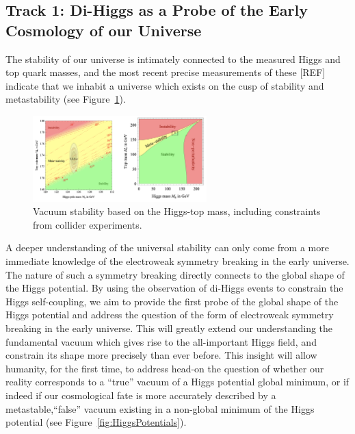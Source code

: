 \documentclass[10pt,oneside,notitlepage,abstracton,a4paper]{scrartcl}
\begin{document}
\subsection{Track 1: Di-Higgs as a Probe of the Early Cosmology of our Universe}

The stability of our universe is intimately connected to the measured Higgs and top quark masses, and the most recent precise measurements of these [REF] indicate that we inhabit a universe which exists on the cusp of stability and metastability (see Figure~\ref{fig:stabilityPlot}). \\

\begin{figure}[!ht]
\centering
\includegraphics[width=0.6\textwidth]{Figures/stability.png}
\caption{Vacuum stability based on the Higgs-top mass, including constraints from collider experiments.}
\label{fig:stabilityPlot}
\end{figure}
 
A deeper understanding of the universal stability can only come from a more immediate knowledge of the electroweak symmetry breaking in the early universe. The nature of such a symmetry breaking directly connects to the global shape of the Higgs potential. By using the observation of di-Higgs events to constrain the Higgs self-coupling, we aim to provide the first probe of the global shape of the Higgs potential and address the question of the form of electroweak symmetry breaking in the early universe. This will greatly extend our understanding the fundamental vacuum which gives rise to the all-important Higgs field, and constrain its shape more precisely than ever before. This insight will allow humanity, for the first time, to address head-on the question of whether our  reality corresponds to a ``true” vacuum of a Higgs potential global minimum, or if indeed if our cosmological fate is more accurately described by a metastable,``false” vacuum existing in a non-global minimum of the Higgs potential (see Figure~\ref{fig:HiggsPotentials}). \\
\end{document}
